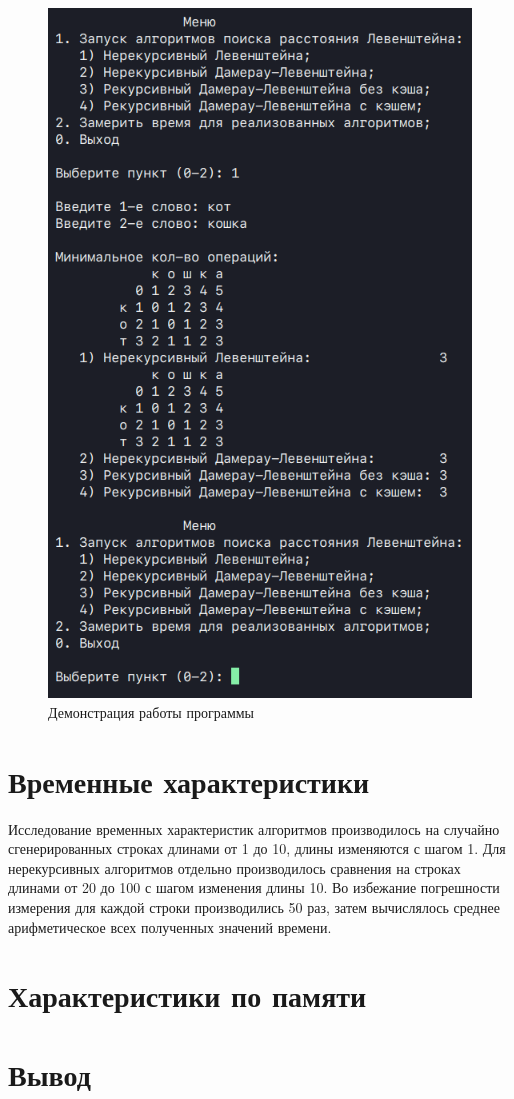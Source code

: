 \clearpage
\begin{figure}[h]
    \centering
    \includegraphics[height=0.7\textheight]{images/prog_demo.png}
    \caption{Демонстрация работы программы}
    \label{fig:prog-demo}
\end{figure}

\section{Временные характеристики}

Исследование временных характеристик алгоритмов производилось на случайно сгенерированных строках длинами от 1 до 10, длины изменяются с шагом 1. Для нерекурсивных алгоритмов отдельно производилось сравнения на строках длинами от 20 до 100 с шагом изменения длины 10. Во избежание погрешности измерения для каждой строки производились 50 раз, затем вычислялось среднее арифметическое всех полученных значений времени.

\section{Характеристики по памяти}

\section{Вывод}